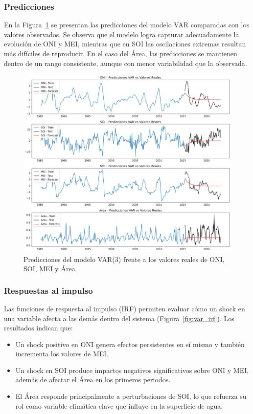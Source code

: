 \subsubsection{Predicciones}
En la Figura~\ref{fig:var_pred} se presentan las predicciones del modelo VAR comparadas con los valores observados. Se observa que el modelo logra capturar adecuadamente la evolución de ONI y MEI, mientras que en SOI las oscilaciones extremas resultan más difíciles de reproducir. En el caso del Área, las predicciones se mantienen dentro de un rango consistente, aunque con menor variabilidad que la observada.

\begin{figure}[H]
    \centering
    \includegraphics[scale=0.45]{Figures/var_pred.png}
    \caption{Predicciones del modelo VAR(3) frente a los valores reales de ONI, SOI, MEI y Área.}
    \label{fig:var_pred}
\end{figure}

\subsubsection{Respuestas al impulso}
Las funciones de respuesta al impulso (IRF) permiten evaluar cómo un shock en una variable afecta a las demás dentro del sistema (Figura~\ref{fig:var_irf}). Los resultados indican que:

\begin{itemize}
    \item Un shock positivo en ONI genera efectos persistentes en sí mismo y también incrementa los valores de MEI.
    \item Un shock en SOI produce impactos negativos significativos sobre ONI y MEI, además de afectar el Área en los primeros periodos.
    \item El Área responde principalmente a perturbaciones de SOI, lo que refuerza su rol como variable climática clave que influye en la superficie de agua.
\end{itemize}


